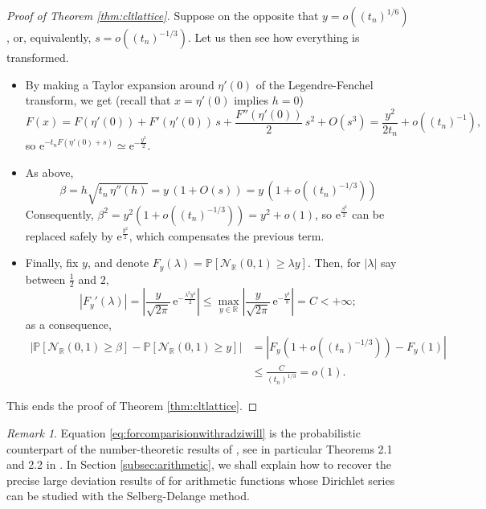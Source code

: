 \documentclass[12pt,a4paper,reqno]{amsart}
\theoremstyle{remark}
\newtheorem{remark}[lemma]{Remark}
\newcommand{\R}{\mathbb{R}}
\newcommand{\E}{\mathrm{e}}
\newcommand{\proba}{\mathbb{P}}
\begin{document}
\begin{proof}[Proof of Theorem \ref{thm:cltlattice}]
Suppose on the opposite that $y=o((t_{n})^{1/6})$, or, equivalently, $s=o((t_{n})^{-1/3})$. Let us then see how everything is transformed.\vspace{2mm}
\begin{itemize}
\item By making a Taylor expansion around $\eta'(0)$ of the Legendre-Fenchel transform, we get (recall that $x=\eta'(0)$ implies $h=0$)
    \begin{equation}
        F(x)=F(\eta'(0))+F'(\eta'(0))\,s+\frac{F''(\eta'(0))}{2}\,s^{2}+O(s^{3})=\frac{y^{2}}{2t_{n}}+o((t_{n})^{-1}),
        \label{EqTaylorF}
    \end{equation}
so $\E^{-t_{n}F(\eta'(0)+s)}\simeq \E^{-\frac{y^{2}}{2}}$.  \vspace{2mm}
\item As above,
\[
\beta=h\sqrt{t_{n}\,\eta''(h)} = y\,(1+O(s))= y\,(1+o((t_{n})^{-1/3}))
\]
Consequently, $\beta^{2}=y^{2}(1+o((t_{n})^{-1/3}))=y^{2}+o(1)$, so $\E^{\frac{\beta^{2}}{2}}$ can be replaced safely by $\E^{\frac{y^{2}}{2}}$, which compensates the previous term.
\vspace{2mm}
\item Finally, fix $y$, and denote $F_{y}(\lambda)=\proba[\mathcal{N}_{\R}(0,1)\geq \lambda y]$. Then, for $|\lambda|$ say between $\frac{1}{2}$ and $2$,
$$|F_{y}'(\lambda)|=\left|\frac{y}{\sqrt{2\pi}}\,\E^{-\frac{\lambda^{2}y^{2}}{2}}\right|\leq \max_{y \in \R} \left|\frac{y}{\sqrt{2\pi}}\,\E^{-\frac{y^{2}}{8}}\right|=C<+\infty;$$
as a consequence,
\begin{align*}
\left|\proba[\mathcal{N}_{\R}(0,1)\geq \beta]-\proba[\mathcal{N}_{\R}(0,1)\geq y]\right|&=\left|F_{y}(1+o((t_{n})^{-1/3}))-F_{y}(1)\right|\\
&\leq \frac{C}{(t_{n})^{1/3}}=o(1).
\end{align*}
\end{itemize}
This ends the proof of Theorem \ref{thm:cltlattice}.
\end{proof}
\medskip

\begin{remark}
Equation \eqref{eq:forcomparisionwithradziwill} is the probabilistic counterpart of the number-theoretic results of \cite{Kub72,Rad09}, see in particular Theorems 2.1 and 2.2 in \cite{Rad09}. In Section \ref{subsec:arithmetic}, we shall explain how to recover the precise large deviation results of \cite{Rad09} for arithmetic functions whose Dirichlet series can be studied with the Selberg-Delange method.
\end{remark}\bigskip
\end{document}

